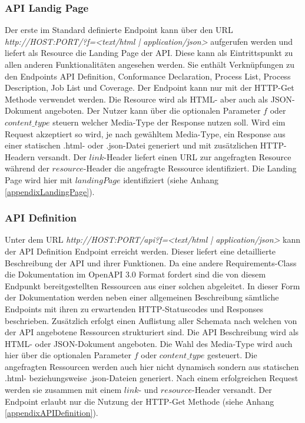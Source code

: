 \subsubsection{API Landig Page}
Der erste im Standard definierte Endpoint kann über den URL \textit{http://HOST:PORT/?f=<text/html | application/json>} aufgerufen werden und liefert als Resource die 
Landing Page der API. Diese kann als Eintrittspunkt zu allen anderen Funktionalitäten angesehen werden. Sie enthält Verknüpfungen zu den Endpoints API Definition, 
Conformance Declaration, Process List, Process Description, Job List und Coverage. Der Endpoint kann nur mit der HTTP-Get Methode verwendet werden. 
Die Resource wird als HTML- aber auch als JSON-Dokument angeboten. Der Nutzer kann über die optionalen Parameter $f$ oder $content\_type$ steuern welcher Media-Type der Response 
nutzen soll. Wird eim Request akzeptiert so wird, je nach gewähltem Media-Type, ein Response aus einer statischen .html- oder .json-Datei generiert und mit zusätzlichen 
HTTP-Headern versandt. Der $link$-Header liefert einen URL zur angefragten Resource während der $resource$-Header die angefragte Ressource identifiziert. 
Die Landing Page wird hier mit $landingPage$ identifiziert (siehe Anhang \ref{appendixLandingPage}). 

\subsubsection{API Definition}
Unter dem URL \textit{http://HOST:PORT/api?f=<text/html | application/json>} kann der API Definition Endpoint erreicht werden. Dieser liefert eine detaillierte Beschreibung
der API und ihrer Funktionen.  Da eine andere Requirements-Class die Dokumentation im  OpenAPI 3.0 Format fordert sind die von diesem Endpunkt bereitgestellten Ressourcen aus 
einer solchen abgeleitet. In dieser Form der Dokumentation werden neben einer allgemeinen Beschreibung sämtliche Endpoints mit ihren zu erwartenden HTTP-Statuscodes und 
Responses beschrieben. Zusätzlich erfolgt einen Auflistung aller Schemata nach welchen von der API angebotene Ressourcen strukturiert sind. Die API Beschreibung wird
als HTML- oder JSON-Dokument angeboten. Die Wahl des Media-Type wird auch hier über die optionalen Parameter $f$ oder $content\_type$ gesteuert. Die angefragten Ressourcen 
werden auch hier nicht dynamisch sondern aus statischen .html- beziehungsweise .json-Dateien generiert. Nach einem erfolgreichen Request werden sie zusammen mit 
einem $link$- und $resource$-Header versandt. Der Endpoint erlaubt nur die Nutzung der HTTP-Get Methode (siehe Anhang \ref{appendixAPIDefinition}).

